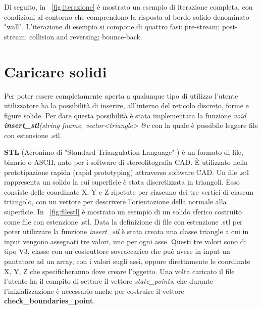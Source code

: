 {Di seguito, in \figurename~\ref{fig:iterazione} \`e mostrato un esempio di iterazione completa, con condizioni al contorno che comprendono la risposta al bordo solido denominato "wall". L'iterazione di esempio si compone di quattro fasi: pre-stream; post-stream; collision and reversing; bounce-back.



\section{Caricare solidi}
Per poter essere completamente aperta a qualunque tipo di utilizzo l'utente utilizzatore ha la possibilit\`a di inserire, all'interno del reticolo discreto, forme e figure solide. Per dare questa possibilit\`a \`e stata implementata la funzione \textit{void \textbf{insert\_stl}(string fname, vector<triangle> \&v} con la quale \`e possibile leggere file con estensione .stl.


\textbf{STL} (Acronimo di "Standard Triangulation Language" ) \`e un formato di file, binario o ASCII, nato per i software di stereolitografia CAD. \`E utilizzato nella prototipazione rapida (rapid prototyping) attraverso software CAD.
Un file .stl rappresenta un solido la cui superficie \`e stata discretizzata in triangoli. Esso consiste delle coordinate X, Y e Z ripetute per ciascuno dei tre vertici di ciascun triangolo, con un vettore per descrivere l'orientazione della normale alla superficie. In \figurename~\ref{fig:filestl} \`e mostrato un esempio di un solido sferico costruito come file con estenzione .stl.
Data la definizione di file con estenzione .stl per poter utilizzare la funzione \textit{insert\_stl} \`e stata creata una classe triangle a cui in input vengono assegnati tre valori, uno per ogni asse. Questi tre valori sono di tipo V3, classe con un costruttore sovraccarico che pu\`o avere in input un puntatore ad un array, con i valori sugli assi, oppure direttamente le coordinate X, Y, Z che specificheranno dove creare l'oggetto.
Una volta caricato il file l'utente ha il compito di settare il vettore \textit{state\_points}, che durante l'inizializzazione \`e necessario anche per costruire il vettore \textbf{check\_boundaries\_point}.

}
